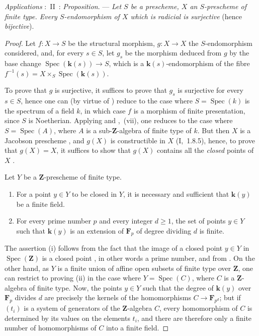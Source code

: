 \begin{env}[10.4.11]
\label{IV.10.4.11}
\emph{Applications} :~II~: \emph{Proposition}. --- \emph{Let $S$ be a prescheme, $X$ an $S$-prescheme of finite type.
Every $S$-endomorphism of $X$ which is radicial is surjective} (hence \emph{bijective}).
\end{env}

\begin{proof}
Let $f:X\to S$ be the structural morphism, $g:X\to X$ the $S$-endomorphism considered, and, for every $s\in S$, let $g_s$ be the morphism deduced from $g$ by the base change $\operatorname{Spec}(\boldsymbol{k}(s))\to S$, which is a $\boldsymbol{k}(s)$-endomorphism of the fibre $f^{-1}(s)=X\times_S\operatorname{Spec}(\boldsymbol{k}(s))$.

To prove that $g$ is surjective, it suffices to prove that $g_s$ is surjective for every $s\in S$, hence one can (by virtue of ) reduce to the case where $S=\operatorname{Spec}(k)$ is the spectrum of a field $k$, in which case $f$ is a morphism of finite presentation, since $S$ is Noetherian.
Applying  and ,~(vii), one reduces to the case where $S=\operatorname{Spec}(A)$, where $A$ is a sub-$\mathbf{Z}$-algebra of finite type of $k$.
But then $X$ is a Jacobson prescheme , and $g(X)$ is constructible in $X$ (I,~1.8.5), hence, to prove that $g(X)=X$, it suffices to show that $g(X)$ contains all the \emph{closed} points of $X$ .

\begin{lemma}[10.4.11.1]
\label{IV.10.4.11.1}
Let $Y$ be a $\mathbf{Z}$-prescheme of finite type.
\begin{enumerate}[label=\textup{(\roman*)}]
  \item For a point $y\in Y$ to be closed in $Y$, it is necessary and sufficient that $\boldsymbol{k}(y)$ be a finite field.
  \item For every prime number $p$ and every integer $d\geq 1$, the set of points $y\in Y$ such that $\boldsymbol{k}(y)$ is an extension of $\mathbf{F}_p$ of degree dividing $d$ is finite.
\end{enumerate}
\end{lemma}

The assertion (i) follows from the fact that the image of a closed point $y\in Y$ in $\operatorname{Spec}(\mathbf{Z})$ is a closed point , in other words a prime number, and from .
On the other hand, as $Y$ is a finite union of affine open subsets of finite type over $\mathbf{Z}$, one can restrict to proving (ii) in the case where $Y=\operatorname{Spec}(C)$, where $C$ is a $\mathbf{Z}$-algebra of finite type.
Now, the points $y\in Y$ such that the degree of $\boldsymbol{k}(y)$ over $\mathbf{F}_p$ divides $d$ are precisely the kernels of the homomorphisms $C\to\mathbf{F}_{p^d}$; but if $(t_i)$ is a system of generators of the $\mathbf{Z}$-algebra $C$, every homomorphism of $C$ is determined by its values on the elements $t_i$, and there are therefore only a finite number of homomorphisms of $C$ into a finite field.


\end{proof}
